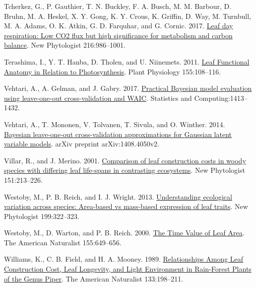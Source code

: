 \documentclass[
  12pt,
  a4paper,
,tablecaptionabove
]{scrartcl}
\newlength{\cslhangindent}
\newenvironment{CSLReferences}[2] %
 {%
  \setlength{\parindent}{0pt}
  \ifodd #1 \everypar{\setlength{\hangindent}{\cslhangindent}}\ignorespaces\fi
  \ifnum #2 > 0
  \setlength{\parskip}{#2\baselineskip}
  \fi
 }%
 {}
\begin{document}
\begin{CSLReferences}{1}{0}
\leavevmode{}%
Tcherkez, G., P. Gauthier, T. N. Buckley, F. A. Busch, M. M. Barbour, D.
Bruhn, M. A. Heskel, X. Y. Gong, K. Y. Crous, K. Griffin, D. Way, M.
Turnbull, M. A. Adams, O. K. Atkin, G. D. Farquhar, and G. Cornic. 2017.
\href{https://doi.org/10.1111/nph.14816}{Leaf day respiration: Low {CO2}
flux but high significance for metabolism and carbon balance}. New
Phytologist 216:986--1001.

\leavevmode{}%
Terashima, I., Y. T. Hanba, D. Tholen, and U. Niinemets. 2011.
\href{https://doi.org/10.1104/pp.110.165472}{Leaf {Functional Anatomy}
in {Relation} to {Photosynthesis}}. Plant Physiology 155:108--116.

\leavevmode{}%
Vehtari, A., A. Gelman, and J. Gabry. 2017.
\href{https://doi.org/10.1007/s11222-016-9696-4}{Practical {Bayesian}
model evaluation using leave-one-out cross-validation and {WAIC}}.
Statistics and Computing:1413--1432.

\leavevmode{}%
Vehtari, A., T. Mononen, V. Tolvanen, T. Sivula, and O. Winther. 2014.
\href{https://arxiv.org/abs/1408.4050v2}{Bayesian leave-one-out
cross-validation approximations for {Gaussian} latent variable models}.
arXiv preprint arXiv:1408.4050v2.

\leavevmode{}%
Villar, R., and J. Merino. 2001.
\href{https://doi.org/10.1046/j.1469-8137.2001.00147.x}{Comparison of
leaf construction costs in woody species with differing leaf life-spans
in contrasting ecosystems}. New Phytologist 151:213--226.

\leavevmode{}%
Westoby, M., P. B. Reich, and I. J. Wright. 2013.
\href{https://doi.org/10.1111/nph.12345}{Understanding ecological
variation across species: {Area-based} vs mass-based expression of leaf
traits}. New Phytologist 199:322--323.

\leavevmode{}%
Westoby, M., D. Warton, and P. B. Reich. 2000.
\href{https://doi.org/10.1086/303346}{The {Time Value} of {Leaf Area}}.
The American Naturalist 155:649--656.

\leavevmode{}%
Williams, K., C. B. Field, and H. A. Mooney. 1989.
\href{https://doi.org/10.1086/284910}{Relationships {Among Leaf
Construction Cost}, {Leaf Longevity}, and {Light Environment} in
{Rain-Forest Plants} of the {Genus Piper}}. The American Naturalist
133:198--211.


\end{CSLReferences}
\end{document}
